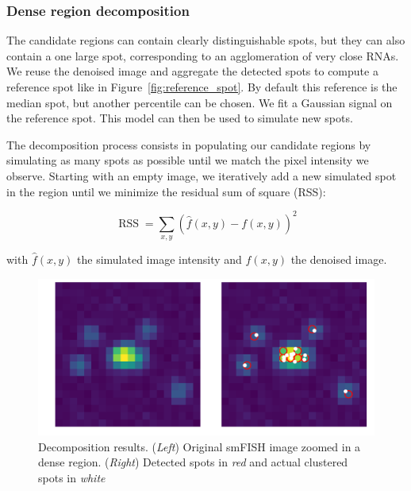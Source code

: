 \subsubsection{Dense region decomposition}

The candidate regions can contain clearly distinguishable spots, but they can also contain a one large spot, corresponding to an agglomeration of very close \ac{RNA}s. 
We reuse the denoised image and aggregate the detected spots to compute a reference spot like in Figure~\ref{fig:reference_spot}.
By default this reference is the median spot, but another percentile can be chosen.
We fit a Gaussian signal on the reference spot.
This model can then be used to simulate new spots.

The decomposition process consists in populating our candidate regions by simulating as many spots as possible until we match the pixel intensity we observe.
Starting with an empty image, we iteratively add a new simulated spot in the region until we minimize the residual sum of square (RSS):

\begin{equation}
	{\displaystyle \operatorname{RSS} = \sum _{x, y}(\hat{f}(x, y) - f(x, y))^{2}}
\end{equation}

\noindent
with $\hat{f}(x, y)$ the simulated image intensity and $f(x, y)$ the denoised image.

\begin{figure}[h]
    \centering
    \includegraphics[width=1\textwidth]{figures/chapter2/plot_dense_decomposition}
    \caption{Decomposition results.
	(\textit{Left}) Original smFISH image zoomed in a dense region.
	(\textit{Right}) Detected spots in \textit{red} and actual clustered spots in \textit{white}}
    \label{fig:dense_decomposition}
\end{figure}

